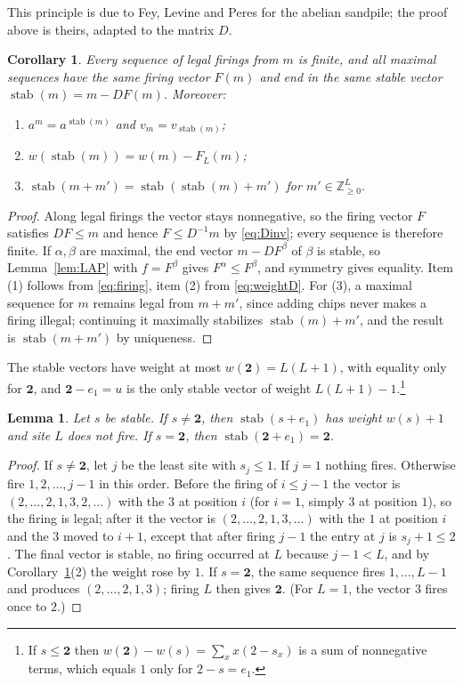 \documentclass[11pt]{amsart}
\newtheorem{lemma}[theorem]{Lemma}
\newtheorem{corollary}[theorem]{Corollary}
\theoremstyle{definition}
\theoremstyle{remark}
\newcommand{\Z}{\mathbb{Z}}
\newcommand{\stab}{\operatorname{stab}}
\newcommand{\two}{\mathbf{2}}
\begin{document}
This principle is due to Fey, Levine and Peres \cite{FLP10} for the abelian sandpile; the proof above is theirs, adapted to the matrix $D$.

\begin{corollary}\label{cor:stab}
Every sequence of legal firings from $m$ is finite, and all maximal sequences have the same firing vector $F(m)$ and end in the same stable vector $\stab(m)=m-DF(m)$. Moreover:
\begin{enumerate}
\item $a^m=a^{\stab(m)}$ and $v_m=v_{\stab(m)}$;
\item $w(\stab(m))=w(m)-F_L(m)$;
\item $\stab(m+m')=\stab(\stab(m)+m')$ for $m'\in\Z_{\ge0}^L$.
\end{enumerate}
\end{corollary}

\begin{proof}
Along legal firings the vector stays nonnegative, so the firing vector $F$ satisfies $DF\le m$ and hence $F\le D^{-1}m$ by \eqref{eq:Dinv}; every sequence is therefore finite. If $\alpha,\beta$ are maximal, the end vector $m-DF^\beta$ of $\beta$ is stable, so Lemma~\ref{lem:LAP} with $f=F^\beta$ gives $F^\alpha\le F^\beta$, and symmetry gives equality. Item (1) follows from \eqref{eq:firing}, item (2) from \eqref{eq:weightD}. For (3), a maximal sequence for $m$ remains legal from $m+m'$, since adding chips never makes a firing illegal; continuing it maximally stabilizes $\stab(m)+m'$, and the result is $\stab(m+m')$ by uniqueness.
\end{proof}

The stable vectors have weight at most $w(\two)=L(L+1)$, with equality only for $\two$, and $\two-e_1=u$ is the only stable vector of weight $L(L+1)-1$.\footnote{If $s\le\two$ then $w(\two)-w(s)=\sum_xx(2-s_x)$ is a sum of nonnegative terms, which equals $1$ only for $2-s=e_1$.}

\begin{lemma}\label{lem:addone}
Let $s$ be stable. If $s\ne\two$, then $\stab(s+e_1)$ has weight $w(s)+1$ and site $L$ does not fire. If $s=\two$, then $\stab(\two+e_1)=\two$.
\end{lemma}

\begin{proof}
If $s\ne\two$, let $j$ be the least site with $s_j\le1$. If $j=1$ nothing fires. Otherwise fire $1,2,\dots,j-1$ in this order. Before the firing of $i\le j-1$ the vector is $(2,\dots,2,1,3,2,\dots)$ with the $3$ at position $i$ (for $i=1$, simply $3$ at position $1$), so the firing is legal; after it the vector is $(2,\dots,2,1,3,\dots)$ with the $1$ at position $i$ and the $3$ moved to $i+1$, except that after firing $j-1$ the entry at $j$ is $s_j+1\le2$. The final vector is stable, no firing occurred at $L$ because $j-1<L$, and by Corollary~\ref{cor:stab}(2) the weight rose by $1$. If $s=\two$, the same sequence fires $1,\dots,L-1$ and produces $(2,\dots,2,1,3)$; firing $L$ then gives $\two$. (For $L=1$, the vector $3$ fires once to $2$.)
\end{proof}
\end{document}
